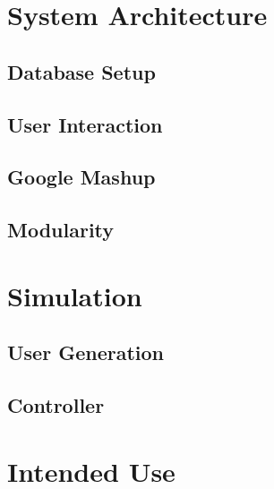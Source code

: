 \documentclass[11pt]{article}
\begin{document}
\section{System Architecture}



\subsection{Database Setup}


\subsection{User Interaction}


\subsection{Google Mashup}

\subsection{Modularity}





\section{Simulation}

\subsection{User Generation}

\subsection{Controller}







\section{Intended Use}
\end{document}
